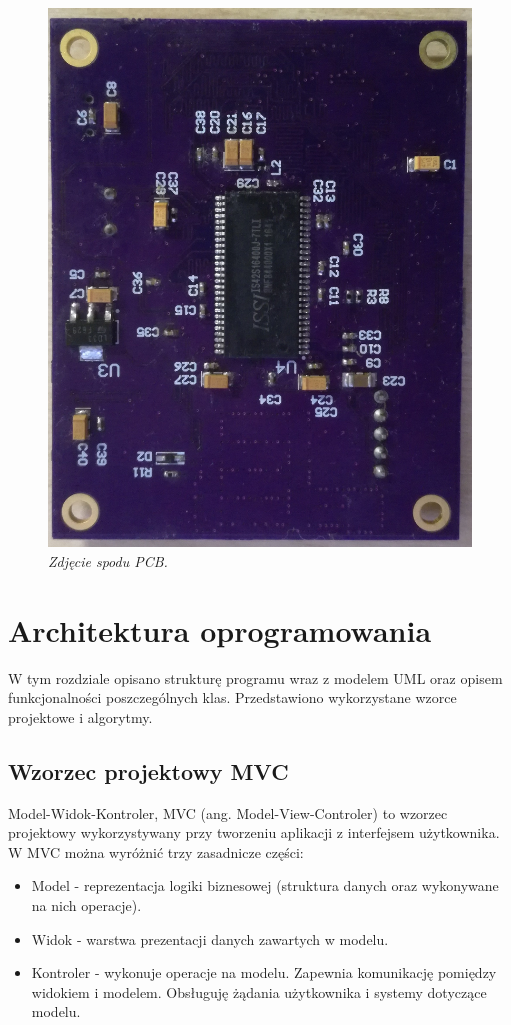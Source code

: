 \documentclass[eng,printmode]{mgr}
\begin{document}
\begin{center}\centering
\begin{figure}[!h]
\vskip 1cm
    \centering
    \includegraphics[width=\textwidth]{images/bottomPcb.jpg}
    \caption{\textit{Zdjęcie spodu PCB.}}
\end{figure}
\end{center}

\chapter{ Architektura oprogramowania}

W tym rozdziale opisano strukturę programu wraz z modelem UML oraz opisem funkcjonalności poszczególnych klas. Przedstawiono wykorzystane wzorce projektowe i algorytmy.



\section{Wzorzec projektowy MVC}
Model-Widok-Kontroler, MVC (ang. Model-View-Controler) to wzorzec projektowy wykorzystywany przy tworzeniu aplikacji z interfejsem użytkownika. W MVC można wyróżnić trzy zasadnicze części:
\begin{itemize}
  \item Model - reprezentacja logiki biznesowej (struktura danych oraz wykonywane na nich operacje).
  \item Widok - warstwa prezentacji danych zawartych w modelu.
  \item Kontroler - wykonuje operacje na modelu. Zapewnia komunikację pomiędzy widokiem i modelem. Obsługuję żądania użytkownika i systemy dotyczące modelu.  
\end{itemize}
\end{document}

